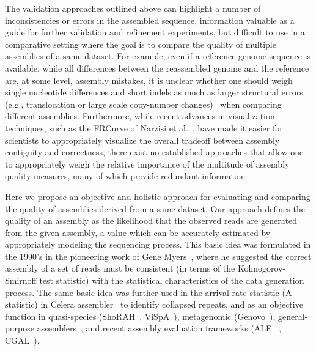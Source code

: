 The validation approaches outlined above can highlight a number of
inconsistencies or errors in the assembled sequence, information
valuable as a guide for further validation and refinement experiments,
but difficult to use in a comparative setting where the goal is to
compare the quality of multiple assemblies of a same dataset.  For
example, even if a reference genome sequence is available, while all
differences between the reassembled genome and the reference are, at
some level, assembly mistakes, it is unclear whether one should weigh
single nucleotide differences and short indels as much as larger
structural errors (e.g., translocation or large scale copy-number
changes)~\cite{earl2011assemblathon} when comparing different
assemblies.  Furthermore, while recent advances in visualization
techniques, such as the FRCurve of Narzisi et
al.~\cite{FRC2011,vezzi2012feature}, have made it easier for
scientists to appropriately visualize the overall tradeoff between
assembly contiguity and correctness, there exist no established
approaches that allow one to appropriately weigh
the relative importance of the multitude of assembly quality measures,
many of which provide redundant information~\cite{vezzi2012feature}.

Here we propose an objective and holistic approach for evaluating and
comparing the quality of assemblies derived from a same dataset.  Our
approach defines the quality of an assembly as the likelihood that the
observed reads are generated from the given assembly, a value which can
be accurately estimated by appropriately modeling the sequencing
process.  This basic idea was formulated in the 1990's in the
pioneering work of Gene Myers~\cite{myers1995}, where he suggested
the correct assembly of a set of reads must be consistent (in terms of
the Kolmogorov-Smirnoff test statistic) with the statistical
characteristics of the data generation process.  The same basic idea
was further used in the arrival-rate statistic (A-statistic) in Celera
assembler~\cite{CeleraAssembler} to identify collapsed repeats, and
as an objective function in quasi-species (ShoRAH~\cite{SHORAH},
ViSpA~\cite{VISPA}), metagenomic (Genovo~\cite{genovo2011}),
general-purpose assemblers~\cite{medvedev2009maximum}, and recent assembly
evaluation frameworks (ALE ~\cite{clark2013ale}, CGAL~\cite{rahman2013cgal}).

